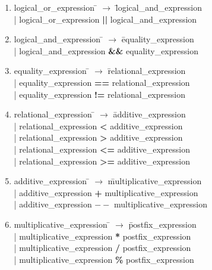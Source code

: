\documentclass[12pt]{article}
\begin{document}
\begin{enumerate}
\item \begin{tabbing} logical{\_}or{\_}expression \= $\to$ \= logical{\_}and{\_}expression \\
	\> | \> logical{\_}or{\_}expression \textbf{||} logical{\_}and{\_}expression
\end{tabbing}

\item \begin{tabbing} logical{\_}and{\_}expression \= $\to$ \= equality{\_}expression \\
	\> | \> logical{\_}and{\_}expression \textbf{\&\&} equality{\_}expression
\end{tabbing}

\item \begin{tabbing} equality{\_}expression \= $\to$ \= relational{\_}expression \\
	\> | \> equality{\_}expression \textbf{==} relational{\_}expression \\
	\> | \> equality{\_}expression \textbf{!=} relational{\_}expression
\end{tabbing}

\item \begin{tabbing} relational{\_}expression \= $\to$ \= additive{\_}expression \\
	\> | \> relational{\_}expression \textbf{<}  additive{\_}expression \\
	\> | \> relational{\_}expression \textbf{>}  additive{\_}expression \\
	\> | \> relational{\_}expression \textbf{<=} additive{\_}expression \\
	\> | \> relational{\_}expression \textbf{>=} additive{\_}expression
\end{tabbing}

\item \begin{tabbing} additive{\_}expression \= $\to$ \= multiplicative{\_}expression \\
	\> | \> additive{\_}expression \textbf{+} multiplicative{\_}expression \\
	\> | \> additive{\_}expression \textbf{$--$} multiplicative{\_}expression
\end{tabbing}

\item \begin{tabbing} multiplicative{\_}expression \= $\to$ \= postfix{\_}expression \\
	\> | \> multiplicative{\_}expression \textbf{*} postfix{\_}expression \\
	\> | \> multiplicative{\_}expression \textbf{/} postfix{\_}expression \\
	\> | \> multiplicative{\_}expression \textbf{\%} postfix{\_}expression
\end{tabbing}


\end{enumerate}
\end{document}
